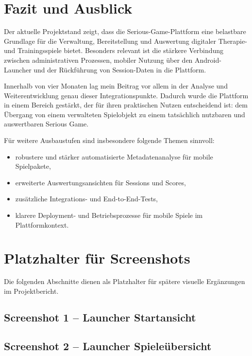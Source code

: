 \documentclass[12pt,a4paper]{article}
\begin{document}
\section{Fazit und Ausblick}
Der aktuelle Projektstand zeigt, dass die Serious-Game-Plattform eine belastbare Grundlage für die Verwaltung, Bereitstellung und Auswertung digitaler Therapie- und Trainingsspiele bietet. Besonders relevant ist die stärkere Verbindung zwischen administrativen Prozessen, mobiler Nutzung über den Android-Launcher und der Rückführung von Session-Daten in die Plattform.

Innerhalb von vier Monaten lag mein Beitrag vor allem in der Analyse und Weiterentwicklung genau dieser Integrationspunkte. Dadurch wurde die Plattform in einem Bereich gestärkt, der für ihren praktischen Nutzen entscheidend ist: dem Übergang von einem verwalteten Spielobjekt zu einem tatsächlich nutzbaren und auswertbaren Serious Game.

Für weitere Ausbaustufen sind insbesondere folgende Themen sinnvoll:
\begin{itemize}[leftmargin=1.5em]
  \item robustere und stärker automatisierte Metadatenanalyse für mobile Spielpakete,
  \item erweiterte Auswertungsansichten für Sessions und Scores,
  \item zusätzliche Integrations- und End-to-End-Tests,
  \item klarere Deployment- und Betriebsprozesse für mobile Spiele im Plattformkontext.
\end{itemize}

\section{Platzhalter für Screenshots}
Die folgenden Abschnitte dienen als Platzhalter für spätere visuelle Ergänzungen im Projektbericht.

\subsection*{Screenshot 1 -- Launcher Startansicht}

\subsection*{Screenshot 2 -- Launcher Spieleübersicht}
\end{document}
